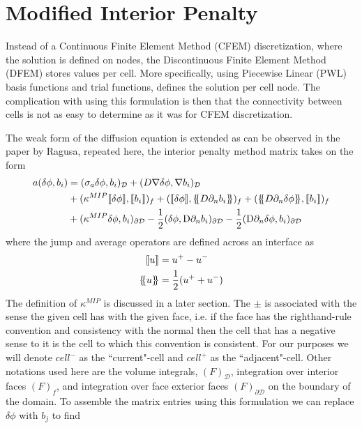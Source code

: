 \documentclass[11pt,letterpaper,titlepage]{article}
\newcommand*{\ldblbrace}{\{\mskip-5mu\{}
\newcommand*{\rdblbrace}{\}\mskip-5mu\}}
\numberwithin{equation}{section}
\begin{document}
\newpage
{}
\section{Modified Interior Penalty}
Instead of a Continuous Finite Element Method (CFEM) discretization, 
where the solution is defined on nodes, the Discontinuous Finite Element
Method (DFEM) stores values per cell. More specifically, using Piecewise
Linear (PWL) basis functions and trial functions, defines the solution per cell 
node. The complication with using this formulation is then that the 
connectivity between cells is not as easy to determine as it was for 
CFEM discretization.

The weak form of the diffusion equation is extended as can be observed 
in the paper by Ragusa, repeated here, the interior penalty method matrix takes on the form
\begin{equation*}
\begin{aligned}
a(\delta \phi,b_i) &= 
(\sigma_a \delta \phi, b_i)_{\mathcal{D}} + 
(D\nabla \delta \phi,\nabla b_i)_{\mathcal{D}} \\
&+ 
(\kappa^{MIP} \llbracket \delta \phi \rrbracket,\llbracket b_i \rrbracket)_f +
(\llbracket \delta \phi \rrbracket,\ldblbrace D \partial_n b_i \rdblbrace)_f +
(\ldblbrace D \partial_n \delta \phi \rdblbrace,\llbracket b_i \rrbracket)_f \\
&+
(\kappa^{M I P} \delta \phi, b_{i})_{\partial \mathcal{D}} -
\frac{1}{2}(\delta \phi, \mathrm{D} \partial_{n} b_{i})_{\partial \mathcal{D}}-
\frac{1}{2}(\mathrm{D} \partial_{n} \delta \phi, b_{i})_{\partial \mathcal{D}}
\end{aligned}
\end{equation*}
\newline
where the jump and average operators are defined across an interface as
\begin{equation*}
\begin{aligned}
\llbracket u \rrbracket &= u^+ - u^- \\
\ldblbrace u \rdblbrace &= \frac{1}{2}(u^+ + u^-)
\end{aligned}
\end{equation*}
\newline 
The definition of $\kappa^{MIP}$ is discussed in a later section.
The $\pm$ is associated with the sense the given cell has with the given 
face, i.e. if the face has the righthand-rule convention and consistency 
with the normal then the cell that has a negative sense to it is the 
cell to which this convention is consistent. For our purposes we will 
denote $cell^-$ as the ``current"-cell and $cell^+$ as the ``adjacent"-cell.
\newline 
\newline
Other notations used here are the volume integrals, $(F)_{\mathcal{D}}$, 
integration over interior faces $(F)_f$, and integration over face 
exterior faces $(F)_{\partial \mathcal{D}}$ on the boundary of the domain.
\newline 
\newline
To assemble the matrix entries using this formulation we can replace $\delta \phi$ with $b_j$ to find
\end{document}
